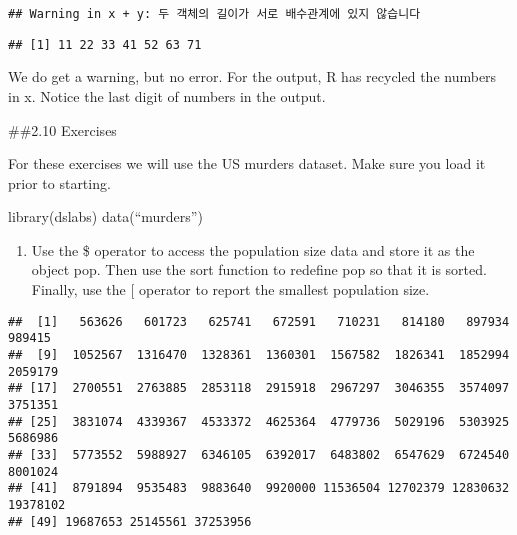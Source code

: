 \documentclass[
]{article}
\newenvironment{Shaded}{\begin{snugshade}}{\end{snugshade}}
\newcommand{\FunctionTok}[1]{\textcolor[rgb]{0.00,0.00,0.00}{#1}}
\newcommand{\NormalTok}[1]{#1}
\newcommand{\OtherTok}[1]{\textcolor[rgb]{0.56,0.35,0.01}{#1}}
\newcommand{\SpecialCharTok}[1]{\textcolor[rgb]{0.00,0.00,0.00}{#1}}
\providecommand{\tightlist}{%
  \setlength{\itemsep}{0pt}\setlength{\parskip}{0pt}}
\begin{document}
\begin{verbatim}
## Warning in x + y: 두 객체의 길이가 서로 배수관계에 있지 않습니다
\end{verbatim}

\begin{verbatim}
## [1] 11 22 33 41 52 63 71
\end{verbatim}

We do get a warning, but no error. For the output, R has recycled the
numbers in x. Notice the last digit of numbers in the output.

\#\#2.10 Exercises

For these exercises we will use the US murders dataset. Make sure you
load it prior to starting.

library(dslabs) data(``murders'')

\begin{enumerate}
\def\labelenumi{\arabic{enumi}.}
\tightlist
\item
  Use the \$ operator to access the population size data and store it as
  the object pop. Then use the sort function to redefine pop so that it
  is sorted. Finally, use the {[} operator to report the smallest
  population size.
\end{enumerate}

\begin{Shaded}
\end{Shaded}

\begin{verbatim}
##  [1]   563626   601723   625741   672591   710231   814180   897934   989415
##  [9]  1052567  1316470  1328361  1360301  1567582  1826341  1852994  2059179
## [17]  2700551  2763885  2853118  2915918  2967297  3046355  3574097  3751351
## [25]  3831074  4339367  4533372  4625364  4779736  5029196  5303925  5686986
## [33]  5773552  5988927  6346105  6392017  6483802  6547629  6724540  8001024
## [41]  8791894  9535483  9883640  9920000 11536504 12702379 12830632 19378102
## [49] 19687653 25145561 37253956
\end{verbatim}

\begin{Shaded}
\end{Shaded}
\end{document}
